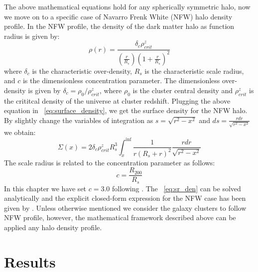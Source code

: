  The above mathematical equations hold for any spherically symmetric halo, now we move on to a specific case of Navarro Frenk White (NFW) halo density profile.
 In the NFW profile, the density of the dark matter halo as function radius is given by:
 \begin{equation}
 \rho(r)= \frac{\delta_{c}\rho^{z}_{crit}}{(\frac{r}{R_{s}})(1+\frac{r}{R_{s}})^{2}}
 \end{equation}
 where $\delta_{c}$ is the characteristic over-density, $R_{s}$ is the characteristic scale radius, and $c$ is the dimensionless concentration parameter.
 The dimensionless over-density is given by $\delta_{c} = \rho_{0}/\rho^{z}_{crit}$, where $\rho_{0}$ is the cluster central density and  $\rho^{z}_{crit}$  is the crititcal density of the universe at cluster redshift.
 Plugging the above equation in ~\ref{eq:surface_density}, we get the surface density for the NFW halo. 
 By slightly change the variables of integration as $s=\sqrt{r^{2} - x^{2}}$ and $ds = \frac{rdr}{\sqrt{r^{2} - x^{2}}}$ we obtain:
 \begin{equation}
 \Sigma(x) = 2\delta_{c} \rho^{z}_{crit} R^{3}_{s} \int^{\inf}_{x} \frac{1}{r(R_{s} + r)^{2}} \frac{rdr}{\sqrt{r^{2} - x^{2}}}
 \label{eq:sr_den}
 \end{equation}
 The scale radius is related to the concentration parameter as follows:
 \begin{equation}
 c = \frac{R_{200}}{R_{s}}
 \end{equation}
 In this chapter we have set $c = 3.0$ following \cite{bhattacharya13}.
 The ~\ref{eq:sr_den} can be solved analytically and the explicit closed-form expression for the NFW case has been given by \cite{bartelmann96}.
 Unless otherwise mentioned we consider the galaxy clusters to follow NFW profile, however,  the mathematical framework described above can be applied any halo density profile. 
 
 
 \section{Results}

